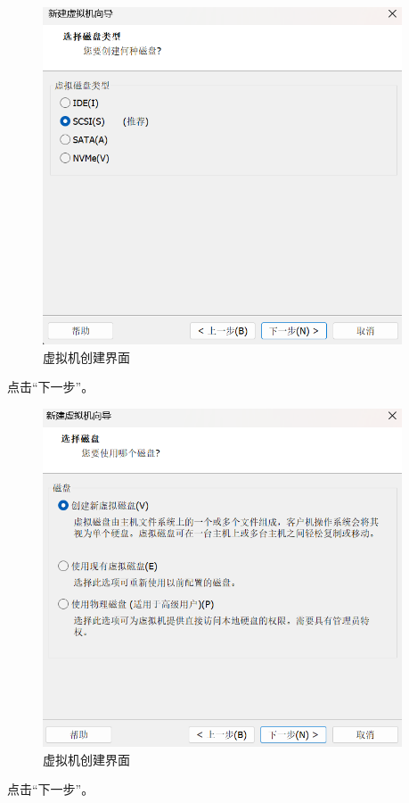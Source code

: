 \documentclass[UTF8]{ctexart}
\begin{document}
\begin{figure}[H]
    \centering
    \includegraphics[width=0.95\textwidth]{picture/Screenshot 2024-10-14 113358.png}
    \caption{虚拟机创建界面}
\end{figure}
点击“下一步”。

\begin{figure}[H]
    \centering
    \includegraphics[width=0.95\textwidth]{picture/Screenshot 2024-10-14 113443.png}
    \caption{虚拟机创建界面}
\end{figure}
点击“下一步”。
\end{document}
